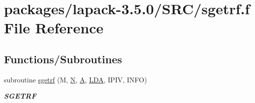 \hypertarget{sgetrf_8f}{}\section{packages/lapack-\/3.5.0/\+S\+R\+C/sgetrf.f File Reference}
\label{sgetrf_8f}
\subsection*{Functions/\+Subroutines}
\begin{DoxyCompactItemize}
\item 
subroutine \hyperlink{group__realGEcomputational_ga8d99c11b94db3d5eac75cac46a0f2e17}{sgetrf} (M, \hyperlink{polmisc_8c_a0240ac851181b84ac374872dc5434ee4}{N}, \hyperlink{classA}{A}, \hyperlink{example__user_8c_ae946da542ce0db94dced19b2ecefd1aa}{L\+D\+A}, I\+P\+I\+V, I\+N\+F\+O)
\begin{DoxyCompactList}\small\item\em {\bfseries S\+G\+E\+T\+R\+F} \end{DoxyCompactList}\end{DoxyCompactItemize}
